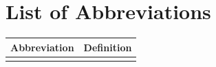
\chapter*{List of Abbreviations}

\vspace{1cm}

\begin{longtable}{p{3cm} p{10cm}}
    
    \textbf{Abbreviation} & \textbf{Definition} \\[0.3cm]
    \hline \\[0.2cm]
    

\end{longtable}

